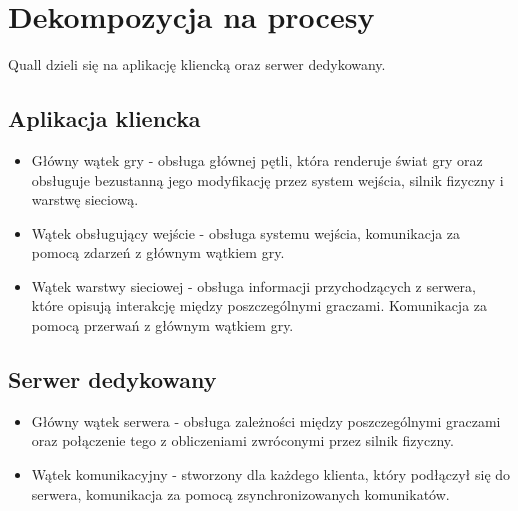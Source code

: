 \documentclass[12pt,a4paper,twoside]{article}
\begin{document}
\section{Dekompozycja na procesy}


Quall dzieli się na aplikację kliencką oraz serwer dedykowany.

\subsection{Aplikacja kliencka}

\begin{itemize}
\item Główny wątek gry - obsługa głównej pętli, która renderuje świat gry oraz obsługuje bezustanną jego modyfikację przez system wejścia, silnik fizyczny i warstwę sieciową.
\item Wątek obsługujący wejście - obsługa systemu wejścia, komunikacja za pomocą zdarzeń z głównym wątkiem gry.
\item Wątek warstwy sieciowej - obsługa informacji przychodzących z serwera, które opisują interakcję między poszczególnymi graczami. Komunikacja za pomocą przerwań z głównym wątkiem gry.
\end{itemize}

\subsection{Serwer dedykowany}

\begin{itemize}
\item Główny wątek serwera - obsługa zależności między poszczególnymi graczami oraz połączenie tego z obliczeniami zwróconymi przez silnik fizyczny.
\item Wątek komunikacyjny - stworzony dla każdego klienta, który podłączył się do serwera, komunikacja za pomocą zsynchronizowanych komunikatów.
\end{itemize}
\end{document}
